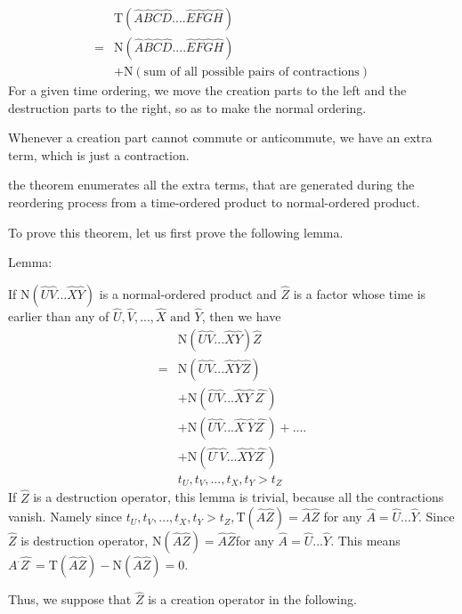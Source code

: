 \begin{align}
&\mathrm{T}(\hat{A}\hat{B}\hat{C}\hat{D}....\hat{E}\hat{F}\hat{G}\hat{H}) \nonumber \\
=&\mathrm{N}(\hat{A}\hat{B}\hat{C}\hat{D}....\hat{E}\hat{F}\hat{G}\hat{H}) \nonumber \\
&+\mathrm{N}(\text{sum of all possible pairs of contractions}) \nonumber 
\end{align}
For a given time ordering, we move the creation parts to the left and the destruction parts to the right, so as to make the normal ordering.

Whenever a creation part cannot commute or anticommute, we have an extra term, which is just a contraction.

the theorem enumerates all the extra terms, that are generated during the reordering process from a time-ordered product to normal-ordered product.

To prove this theorem, let us first prove the following lemma.

Lemma:

If $\mathrm{N}(\hat{U}\hat{V}...\hat{X}\hat{Y})$ is a normal-ordered product and $\hat{Z}$ is a factor whose time is earlier than any of $\hat{U},\hat{V},...,\hat{X} \text{ and } \hat{Y}$, then we have
\begin{align}
&\mathrm{N}(\hat{U}\hat{V}...\hat{X}\hat{Y})\hat{Z} \nonumber \\
=&\mathrm{N}(\hat{U}\hat{V}...\hat{X}\hat{Y}\hat{Z})\nonumber \\
&+\mathrm{N}(\hat{U}\hat{V}...\hat{X}\hat{Y^{\cdot}}\hat{Z^{\cdot}})\nonumber \\
&+\mathrm{N}(\hat{U}\hat{V}...\hat{X^{\cdot}}\hat{Y}\hat{Z^{\cdot}})+....\nonumber \\
&+\mathrm{N}(\hat{U^{\cdot}}\hat{V}...\hat{X}\hat{Y}\hat{Z^{\cdot}})\nonumber \\
& t_U,t_V,...,t_X,t_Y>t_Z \nonumber
\end{align}
If $\hat{Z}$ is a destruction operator, this lemma is trivial, because all the contractions vanish. Namely since $t_U,t_V,...,t_X,t_Y>t_Z,\mathrm{T}(\hat{A}\hat{Z})=\hat{A}\hat{Z}$ for any $\hat{A}=\hat{U}...\hat{Y}$. Since $\hat{Z}$ is destruction operator, $\mathrm{N}(\hat{A}\hat{Z})=\hat{A}\hat{Z}$for any $\hat{A}=\hat{U}...\hat{Y}$. This means $\hat{A^{\cdot}}\hat{Z^{\cdot}}=\mathrm{T}(\hat{A}\hat{Z})-\mathrm{N}(\hat{A}\hat{Z})=0$.

Thus, we suppose that $\hat{Z}$ is a creation operator in the following.

